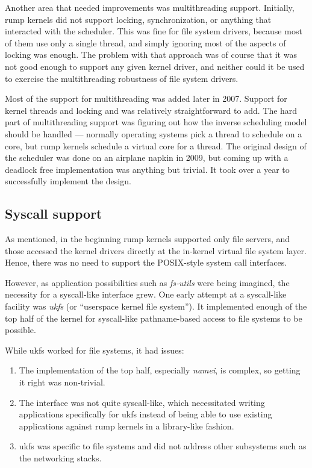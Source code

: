 Another area that needed improvements was multithreading support.
Initially, rump kernels did not support locking, synchronization, or
anything that interacted with the scheduler.  This was fine for file
system drivers, because most of them use only a single thread, and
simply ignoring most of the aspects of locking was enough.  The problem
with that approach was of course that it was not good enough to support
any given kernel driver, and neither could it be used to exercise the
multithreading robustness of file system drivers.

Most of the support for multithreading was added later in 2007.  Support
for kernel threads and locking and was relatively straightforward to add.
The hard part of multithreading support was figuring out how the inverse
scheduling model should be handled --- normally operating systems pick a
thread to schedule on a core, but rump kernels schedule a virtual core for
a thread.  The original design of the scheduler was done on an airplane
napkin in 2009, but coming up with a deadlock free implementation was
anything but trivial.  It took over a year to successfully implement
the design.


\subsection{Syscall support}

As mentioned, in the beginning rump kernels supported only file servers,
and those accessed the kernel drivers directly at the in-kernel virtual
file system layer.  Hence, there was no need to support the POSIX-style
system call interfaces.

However, as application possibilities such as \textit{fs-utils}
were being imagined, the necessity for a syscall-like interface grew.
One early attempt at a syscall-like facility was \textit{ukfs} (or
``userspace kernel file system'').  It implemented enough of the top half
of the kernel for syscall-like pathname-based access to file systems to
be possible.

While ukfs worked for file systems, it had issues:
\begin{enumerate}
\item	The implementation of the top half, especially \textit{namei},
	is complex, so getting it right was non-trivial.
\item	The interface was not quite syscall-like, which necessitated
	writing applications specifically for ukfs instead of being able
	to use existing applications against rump kernels in a library-like
	fashion.
\item	ukfs was specific to file systems and did not address
	other subsystems such as the networking stacks.
\end{enumerate}

